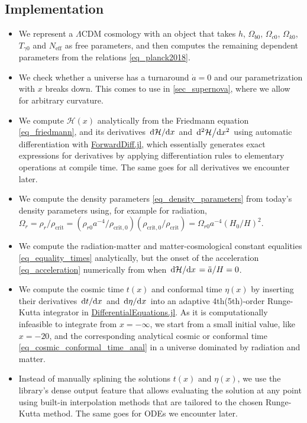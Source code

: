 \documentclass[10pt,a4paper]{article}
\begin{document}
\subsection{Implementation}
\label{sec_background_cosmology_implementation}

\begin{itemize}
	\item We represent a $\Lambda$CDM cosmology with an object that takes $h$, $\Omega_{b0}$, $\Omega_{c0}$, $\Omega_{k0}$, $T_{\gamma0}$ and $N_\text{eff}$ as free parameters,
	      and then computes the remaining dependent parameters from the relations \eqref{eq_planck2018}.
	\item We check whether a universe has a turnaround $\dot{a} = 0$ and our parametrization with $x$ breaks down.
	      This comes to use in \cref{sec_supernova}, where we allow for arbitrary curvature.
	\item We compute $\mathcal{H}(x)$ analytically from the Friedmann equation \eqref{eq_friedmann},
	      and its derivatives $\odv{\mathcal{H}}/{x}$ and $\odv[2]{\mathcal{H}}/{x}$ using automatic differentiation with \href{https://github.com/JuliaDiff/ForwardDiff.jl}{ForwardDiff.jl},
	      which essentially generates exact expressions for derivatives by applying differentiation rules to elementary operations at compile time.
	      The same goes for all derivatives we encounter later.
	\item We compute the density parameters \eqref{eq_density_parameters} from today's density parameters using, for example for radiation, $\Omega_r = \rho_r / \rho_\text{crit} = (\rho_{r0} a^{-4} / \rho_{\text{crit},0}) (\rho_{\text{crit},0} / \rho_\text{crit}) = \Omega_{r0} a^{-4} (H_0 / H)^2$.
	\item We compute the radiation-matter and matter-cosmological constant equalities \eqref{eq_equality_times} analytically,
	      but the onset of the acceleration \eqref{eq_acceleration} numerically from when $\odv{\mathcal{H}}/{x} = \ddot{a} / H = 0$.
	\item We compute the cosmic time $t(x)$ and conformal time $\eta(x)$ by inserting their derivatives $\odv{t}/{x}$ and $\odv{\eta}/{x}$ into an adaptive 4th(5th)-order Runge-Kutta integrator in \href{https://github.com/SciML/DifferentialEquations.jl}{DifferentialEquations.jl}.
	      As it is computationally infeasible to integrate from $x=-\infty$,
	      we start from a small initial value, like $x = -20$,
	      and the corresponding analytical cosmic or conformal time \eqref{eq_cosmic_conformal_time_anal} in a universe dominated by radiation and matter.
	\item Instead of manually splining the solutions $t(x)$ and $\eta(x)$,
	      we use the library's dense output feature that allows evaluating the solution at any point
	      using built-in interpolation methods that are tailored to the chosen Runge-Kutta method.
          The same goes for ODEs we encounter later.
\end{itemize}
\end{document}
